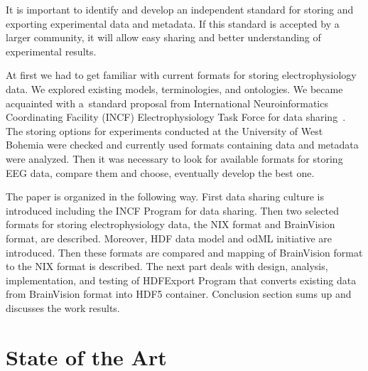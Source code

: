 \documentclass[conference]{IEEEtran}
\begin{document}
It is important to identify and develop an independent standard for storing and exporting experimental data and metadata. If this standard is accepted by a larger community, it will allow easy sharing and better understanding of experimental results.

At first we had to get familiar with current formats for storing electrophysiology data. We explored existing models, terminologies, and ontologies. We became acquainted with a~standard proposal from International Neuroinformatics Coordinating Facility (INCF) Electrophysiology Task Force for data sharing~\cite{incfwebtaskforce}. The storing options for experiments conducted at the University of West Bohemia were checked and currently used formats containing data and metadata were analyzed. Then it was necessary to look for available formats for storing EEG data, compare them and choose, eventually develop the best one.

The paper is organized in the following way. First data sharing culture is introduced including the INCF Program for data sharing. Then two selected formats for storing electrophysiology data, the NIX format and BrainVision format, are described. Moreover, HDF data model and odML initiative are introduced. Then these formats are compared and mapping of BrainVision format to the NIX format is described. The next part deals with design, analysis, implementation, and testing of HDFExport Program that converts existing data from BrainVision format into HDF5 container. Conclusion section sums up and discusses the work results.

\section{State of the Art}
\end{document}
